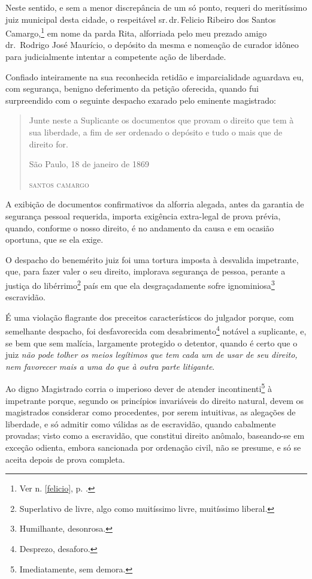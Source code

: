 Neste sentido, e sem a menor discrepância de um só ponto, requeri do
meritíssimo juiz municipal desta cidade, o respeitável sr.\,dr.\,Felicio
Ribeiro dos Santos Camargo,\footnote{Ver n. \ref{felicio}, p. \pageref{felicio}.} 
em nome da parda Rita, alforriada pelo meu prezado amigo dr.~Rodrigo 
José Maurício, o depósito da mesma e nomeação de curador idôneo
para judicialmente intentar a competente ação de liberdade.

Confiado inteiramente na sua reconhecida retidão e imparcialidade
aguardava eu, com segurança, benigno deferimento da petição oferecida,
quando fui surpreendido com o seguinte despacho exarado pelo eminente
magistrado:

\begin{quote}
Junte neste a Suplicante os documentos que provam o direito que
tem à sua liberdade, a fim de ser ordenado o depósito e tudo o mais que
de direito for.

\begin{flushright}
São Paulo, 18 de janeiro de 1869

\textsc{santos camargo}
\end{flushright}
\end{quote}

A exibição de documentos confirmativos da alforria alegada, antes da
garantia de segurança pessoal requerida, importa exigência extra-legal
de prova prévia, quando, conforme o nosso direito, é no andamento da
causa e em ocasião oportuna, que se ela exige.

O despacho do benemérito juiz foi uma tortura imposta à desvalida
impetrante, que, para fazer valer o seu direito, implorava segurança de
pessoa, perante a justiça do libérrimo\footnote{Superlativo de livre,
  algo como muitíssimo livre, muitíssimo liberal.} país em que ela
desgraçadamente sofre ignominiosa\footnote{Humilhante, desonrosa.}
escravidão.

É uma violação flagrante dos preceitos característicos do julgador
porque, com semelhante despacho, foi desfavorecida com
desabrimento\footnote{Desprezo, desaforo.} notável a suplicante, e, se
bem que sem malícia, largamente protegido o detentor, quando é certo que
o juiz \emph{não pode tolher os meios legítimos que tem cada um de usar
de seu direito, nem favorecer mais a uma do que à outra parte
litigante}.

Ao digno Magistrado corria o imperioso dever de atender
incontinenti\footnote{Imediatamente, sem demora.} à impetrante porque,
segundo os princípios invariáveis do direito natural, devem os
magistrados considerar como procedentes, por serem intuitivas, as
alegações de liberdade, e só admitir como válidas as de escravidão,
quando cabalmente provadas; visto como a escravidão, que constitui
direito anômalo, baseando-se em exceção odienta, embora sancionada por
ordenação civil, não se presume, e só se aceita depois de prova
completa.

